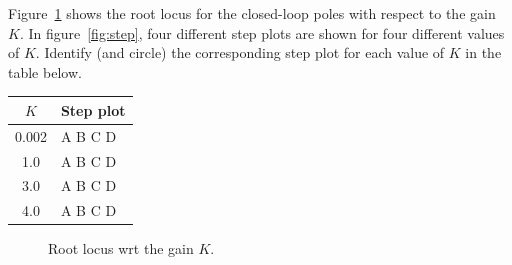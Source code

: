 \documentclass[a4paper,12pt]{article}
\begin{document}
Figure~\ref{fig:rlocus} shows the root locus for the closed-loop poles with respect to the gain $K$. In figure~\ref{fig:step}, four different step plots are shown for four different values of $K$. Identify (and circle) the corresponding step plot for each value of $K$ in the table below.

\begin{center}
\begin{tabular}{cl}
\(K\) & Step plot\\\hline
0.002 & A\hspace*{2mm} B\hspace*{2mm} C\hspace*{2mm} D\\
1.0 & A\hspace*{2mm}  B\hspace*{2mm}  C\hspace*{2mm} D\\
3.0 & A\hspace*{2mm} B\hspace*{2mm}  C\hspace*{2mm} D\\
4.0 & A\hspace*{2mm} B\hspace*{2mm}  C\hspace*{2mm} D\\ \hline
\end{tabular}
\end{center}

\begin{figure}[bp]
\begin{center}

\caption{Root locus wrt the gain $K$.}
\label{fig:rlocus}
\end{center}
\end{figure}
\end{document}
